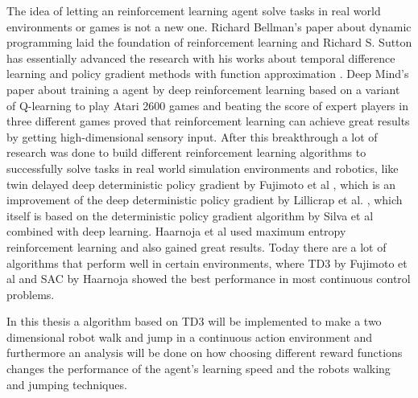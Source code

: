 The idea of letting an reinforcement learning agent solve tasks in real world environments or games is not a new one. Richard Bellman's paper about dynamic programming \cite{bellman1957dynamic} laid the foundation of reinforcement learning and Richard S. Sutton has essentially advanced the research with his works about temporal difference learning \cite{sutton1988learning} and policy gradient methods with function approximation \cite{sutton1999policy}. Deep Mind's paper about training a agent by deep reinforcement learning based on a variant of Q-learning to play Atari 2600 games and beating the score of expert players in three different games \cite{mnih2013playing} proved that reinforcement learning can achieve great results by getting high-dimensional sensory input. After this breakthrough a lot of research was done to build different reinforcement learning algorithms to successfully solve tasks in real world simulation environments and robotics, like twin delayed deep deterministic policy gradient by Fujimoto et al \cite{fujimoto2018}, which is an improvement of the deep deterministic policy gradient by Lillicrap et al. \cite{lillicrap2015continuous}, which itself is based on the deterministic policy gradient algorithm by Silva et al \cite{silver2014deterministic} combined with deep learning. Haarnoja et al used maximum entropy reinforcement learning \cite{haarnoja2018soft} and also gained great results.
Today there are a lot of algorithms that perform well in certain environments, where TD3 by Fujimoto et al and SAC by Haarnoja showed the best performance in most continuous control problems. 

In this thesis a algorithm based on TD3 will be implemented to make a two dimensional robot walk and jump in a continuous action environment and furthermore an analysis will be done on how choosing different reward functions changes the performance of the agent's learning speed and the robots walking and jumping techniques.


